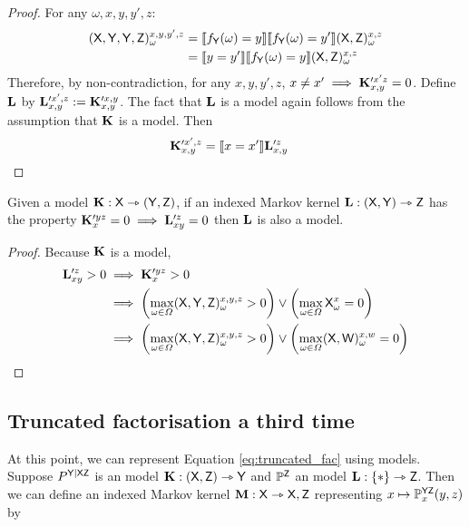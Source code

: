 \begin{proof}
For any $\omega,x,y,y',z$:
\begin{align}
	(\mathsf{X},\mathsf{Y},\mathsf{Y},\mathsf{Z})_\omega^{x,y,y',z} &= \llbracket f_{\mathsf{Y}}(\omega)=y \rrbracket \llbracket f_{\mathsf{Y}}(\omega)=y' \rrbracket (\mathsf{X},\mathsf{Z})_\omega^{x,z} \\
	&= \llbracket y=y' \rrbracket \llbracket f_{\mathsf{Y}}(\omega)=y \rrbracket(\mathsf{X},\mathsf{Z})_\omega^{x,z}
\end{align}
Therefore, by non-contradiction, for any $x,y,y',z$, $x\neq x'\implies \mathbf{K}_{x,y}^{\prime x'z}=0$. Define $\mathbf{L}$ by $\mathbf{L}_{x,y}^{\prime x', z} := \mathbf{K}_{x,y}^{\prime x, y}$. The fact that $\mathbf{L}$ is a model again follows from the assumption that $\mathbf{K}$ is a model. Then
\begin{align}
	\mathbf{K}_{x, y}^{\prime x', z} &= \llbracket x=x' \rrbracket\mathbf{L}_{x,y}^{\prime z}
\end{align}
\end{proof}

\begin{lemma}\label{lem:avoid_contradic}
Given a model $\mathbf{K}:\mathsf{X}\rightarrowtriangle (\mathsf{Y},\mathsf{Z})$, if an indexed Markov kernel $\mathbf{L}:(\mathsf{X},\mathsf{Y})\rightarrowtriangle \mathsf{Z}$ has the property $\mathbf{K}_x^{\prime yz}=0\implies \mathbf{L}_{xy}^{\prime z}=0$ then $\mathbf{L}$ is also a model.
\end{lemma}

\begin{proof}
Because $\mathbf{K}$ is a model,
\begin{align}
	\mathbf{L}_{xy}^{\prime z}>0 &\implies \mathbf{K}_x^{\prime yz} >0 \\
	&\implies \left(\max_{\omega\in \Omega} (\mathsf{X},\mathsf{Y},\mathsf{Z})_{\omega}^{x,y,z} > 0\right) \lor \left(\max_{\omega\in \Omega} \mathsf{X}_{\omega}^{x} = 0\right)\\
	&\implies \left(\max_{\omega\in \Omega} (\mathsf{X},\mathsf{Y},\mathsf{Z})_{\omega}^{x,y,z} > 0\right) \lor \left(\max_{\omega\in \Omega} (\mathsf{X},\mathsf{W})_\omega^{x,w} = 0\right)
\end{align}
\end{proof}

\subsection{Truncated factorisation a third time}

At this point, we can represent Equation \ref{eq:truncated_fac} using models. Suppose $P^{\mathsf{Y|XZ}}$ is an model $\mathbf{K}:(\mathsf{X}, \mathsf{Z})\rightarrowtriangle \mathsf{Y}$ and $\mathbb{P}^{\mathsf{Z}}$ an model $\mathbf{L}:\{*\}\rightarrowtriangle \mathsf{Z}$. Then we can define an indexed Markov kernel $\mathbf{M}:\mathsf{X}\rightarrowtriangle \mathsf{X}, \mathsf{Z}$ representing $x\mapsto \mathbb{P}^{\mathsf{YZ}}_{x}(y,z)$ by

